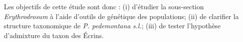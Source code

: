 Les objectifs de cette étude sont donc : (i) d'étudier la sous-section \textit{Erythrodrosum} à l'aide d'outils de génétique des populations; (ii) de clarifier la structure taxonomique de \textit{P. pedemontana s.l.}; (iii) de tester l'hypothèse d'admixture du taxon des Écrins.

